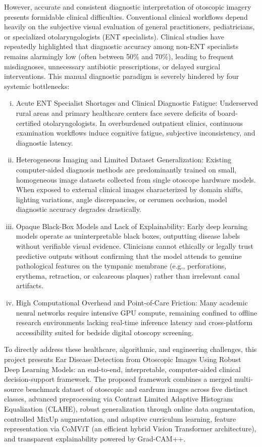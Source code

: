 \documentclass[12pt,a4paper]{report}
\renewcommand{\textbf}[1]{#1}
\begin{document}
However, accurate and consistent diagnostic interpretation of otoscopic imagery presents formidable clinical difficulties. Conventional clinical workflows depend heavily on the subjective visual evaluation of general practitioners, pediatricians, or specialized otolaryngologists (ENT specialists). Clinical studies have repeatedly highlighted that diagnostic accuracy among non-ENT specialists remains alarmingly low (often between 50\% and 70\%), leading to frequent misdiagnoses, unnecessary antibiotic prescriptions, or delayed surgical interventions. This manual diagnostic paradigm is severely hindered by four systemic bottlenecks:
\begin{enumerate}[(i)]
    \item \textbf{Acute ENT Specialist Shortages and Clinical Diagnostic Fatigue:} Underserved rural areas and primary healthcare centers face severe deficits of board-certified otolaryngologists. In overburdened outpatient clinics, continuous examination workflows induce cognitive fatigue, subjective inconsistency, and diagnostic latency.
    \item \textbf{Heterogeneous Imaging and Limited Dataset Generalization:} Existing computer-aided diagnosis methods are predominantly trained on small, homogeneous image datasets collected from single otoscope hardware models. When exposed to external clinical images characterized by domain shifts, lighting variations, angle discrepancies, or cerumen occlusion, model diagnostic accuracy degrades drastically.
    \item \textbf{Opaque Black-Box Models and Lack of Explainability:} Early deep learning models operate as uninterpretable black boxes, outputting disease labels without verifiable visual evidence. Clinicians cannot ethically or legally trust predictive outputs without confirming that the model attends to genuine pathological features on the tympanic membrane (e.g., perforations, erythema, retraction, or calcareous plaques) rather than irrelevant canal artifacts.
    \item \textbf{High Computational Overhead and Point-of-Care Friction:} Many academic neural networks require intensive GPU compute, remaining confined to offline research environments lacking real-time inference latency and cross-platform accessibility suited for bedside digital otoscopy screening.
\end{enumerate}

To directly address these healthcare, algorithmic, and engineering challenges, this project presents \textbf{Ear Disease Detection from Otoscopic Images Using Robust Deep Learning Models}: an end-to-end, interpretable, computer-aided clinical decision-support framework. The proposed framework combines a merged multi-source benchmark dataset of otoscopic and eardrum images across five distinct classes, advanced preprocessing via \textbf{Contrast Limited Adaptive Histogram Equalization (CLAHE)}, robust generalization through \textbf{online data augmentation}, \textbf{controlled MixUp augmentation}, and \textbf{adaptive curriculum learning}, feature representation via \textbf{CoMViT} (an efficient hybrid Vision Transformer architecture), and transparent explainability powered by \textbf{Grad-CAM++}.
\end{document}
